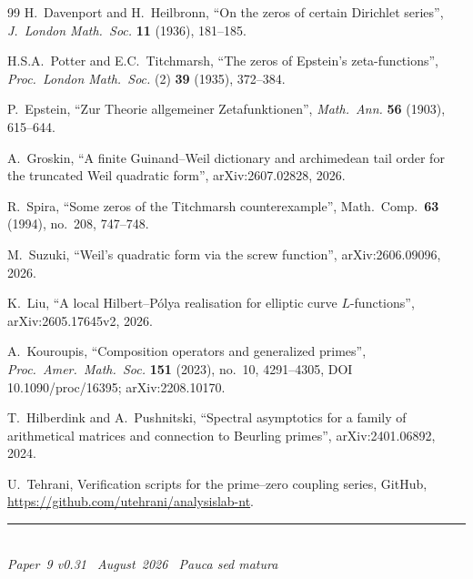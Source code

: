 \documentclass[11pt]{article}
\begin{document}
\begin{thebibliography}{99}
H.~Davenport and H.~Heilbronn,
``On the zeros of certain Dirichlet series'',
\emph{J.\ London Math.\ Soc.} \textbf{11} (1936), 181--185.

H.S.A.~Potter and E.C.~Titchmarsh,
``The zeros of Epstein's zeta-functions'',
\emph{Proc.\ London Math.\ Soc.} (2) \textbf{39} (1935), 372--384.

P.~Epstein,
``Zur Theorie allgemeiner Zetafunktionen'',
\emph{Math.\ Ann.} \textbf{56} (1903), 615--644.

A.~Groskin,
``A finite Guinand--Weil dictionary and archimedean tail order for the
truncated Weil quadratic form'',
arXiv:2607.02828, 2026.

R.~Spira,
``Some zeros of the Titchmarsh counterexample'',
Math.\ Comp.\ \textbf{63} (1994), no.~208, 747--748.

M.~Suzuki,
``Weil's quadratic form via the screw function'',
arXiv:2606.09096, 2026.

K.~Liu,
``A local Hilbert--P\'olya realisation for elliptic curve
$L$-func\-tions'', arXiv:2605.\allowbreak17645v2, 2026.

A.~Kouroupis,
``Composition operators and generalized primes'',
\emph{Proc.\ Amer.\ Math.\ Soc.} \textbf{151} (2023), no.~10, 4291--4305,
DOI 10.1090/proc/16395; arXiv:2208.10170.

T.~Hilberdink and A.~Pushnitski,
``Spectral asymptotics for a family of arithmetical matrices and connection
to Beurling primes'',
arXiv:2401.06892, 2024.

U.~Tehrani,
Verification scripts for the prime--zero coupling series,
GitHub, \url{https://github.com/utehrani/analysislab-nt}.

\end{thebibliography}

\enlargethispage{3\baselineskip}
\vspace*{\fill}
\begin{minipage}{\linewidth}
\rule{\linewidth}{0.4pt}\smallskip\\
\small\emph{Paper~9 v0.31 \textperiodcentered\ August~2026
\textperiodcentered\ Pauca sed matura}
\end{minipage}
\end{document}
